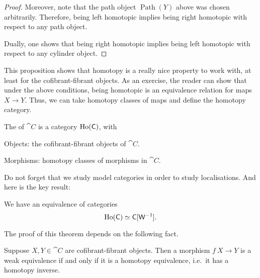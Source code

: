 \begin{proof}
    Moreover, note that the path object $\operatorname{Path}(Y)$ above 
    was chosen arbitrarily. Therefore, being left homotopic implies 
    being right homotopic with respect to any path object.
    
    Dually, one shows that being right homotopic implies 
    being left homotopic with respect to any cylinder object.
\end{proof}

This proposition shows that
homotopy is a really nice property to work with,
at least for the cofibrant-fibrant objects.
As an exercise, the reader can show that
under the above conditions,
being homotopic is an equivalence relation for maps $X\to Y$.
Thus, we can take homotopy classes of maps and
define the homotopy category.

\begin{definition}
    The  of $\cat{C}$ is a category $\operatorname{Ho}(\mathsf{C})$, with
    \begin{itms}
        \item Objects: the cofibrant-fibrant objects of $\cat{C}$.
        \item Morphisms: homotopy classes of morphisms in $\cat{C}$.
    \end{itms}
\end{definition}

Do not forget that we study model categories
in order to study localisations.
And here is the key result:

\begin{theorem}\label{thm-2-a}
    We have an equivalence of categories
    \[\operatorname{Ho}(\mathsf{C})\simeq\mathsf{C}[\mathsf{W}^{-1}].\]
\end{theorem}

The proof of this theorem depends on the following fact.

\begin{proposition}\label{thm-2-w}
    Suppose $X,Y\in\cat C$ are cofibrant-fibrant objects.
    Then a morphism $f\:X\to Y$ is a weak equivalence
    if and only if it is a homotopy equivalence,
    i.e.\ it has a homotopy inverse.
\end{proposition}

